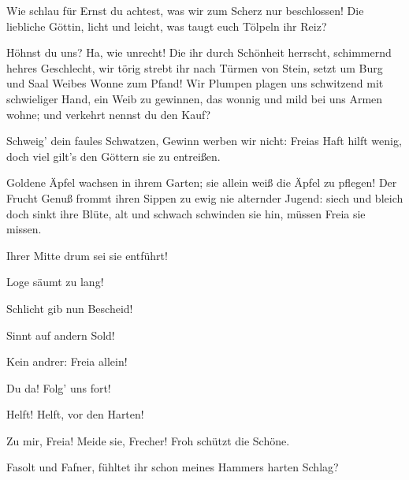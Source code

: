 \begin{drama}
\Wotanspeaks
Wie schlau für Ernst du achtest,
was wir zum Scherz nur beschlossen!
Die liebliche Göttin, licht und leicht,
was taugt euch Tölpeln ihr Reiz?
 

\Fasoltspeaks
Höhnst du uns? Ha, wie unrecht!
Die ihr durch Schönheit herrscht,
schimmernd hehres Geschlecht,
wir törig strebt ihr nach Türmen von Stein,
setzt um Burg und Saal
Weibes Wonne zum Pfand!
Wir Plumpen plagen uns
schwitzend mit schwieliger Hand,
ein Weib zu gewinnen, das wonnig und mild
bei uns Armen wohne;
und verkehrt nennst du den Kauf?
 

\Fafnerspeaks
Schweig' dein faules Schwatzen,
Gewinn werben wir nicht:
Freias Haft hilft wenig,
doch viel gilt's den Göttern sie zu entreißen.
 



Goldene Äpfel wachsen in ihrem Garten;
sie allein weiß die Äpfel zu pflegen!
Der Frucht Genuß frommt ihren Sippen
zu ewig nie alternder Jugend:
siech und bleich doch sinkt ihre Blüte,
alt und schwach schwinden sie hin,
müssen Freia sie missen.
 



Ihrer Mitte drum sei sie entführt!
 

\Wotanspeaks


Loge säumt zu lang!
 

\Fasoltspeaks
Schlicht gib nun Bescheid!
 

\Wotanspeaks
Sinnt auf andern Sold!
 

\Fasoltspeaks
Kein andrer: Freia allein!
 

\Fafnerspeaks
Du da! Folg' uns fort!
 




\Freiaspeaks


Helft! Helft, vor den Harten!
 

\Frohspeaks


Zu mir, Freia! Meide sie, Frecher!
Froh schützt die Schöne.
 

\Donnerspeaks


Fasolt und Fafner,
fühltet ihr schon meines Hammers harten Schlag?
 


\end{drama}
